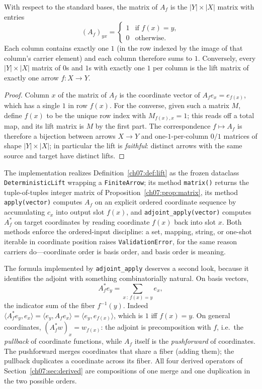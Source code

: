 \begin{proposition}\label{ch07:prop:matrix}
With respect to the standard bases, the matrix of $A_f$ is the
$|Y|\times|X|$ matrix with entries
\[
(A_f)_{y x}=
\begin{cases}
1 & \text{if } f(x)=y,\\
0 & \text{otherwise.}
\end{cases}
\]
Each column contains exactly one $1$ (in the row indexed by the image of that
column's carrier element) and each column therefore sums to $1$. Conversely,
every $|Y|\times|X|$ matrix of $0$s and $1$s with exactly one $1$ per column
is the lift matrix of exactly one arrow $f:X\to Y$.
\end{proposition}

\begin{proof}
Column $x$ of the matrix of $A_f$ is the coordinate vector of $A_f e_x =
e_{f(x)}$, which has a single $1$ in row $f(x)$. For the converse, given such
a matrix $M$, define $f(x)$ to be the unique row index with $M_{f(x),x}=1$;
this reads off a total map, and its lift matrix is $M$ by the first part. The
correspondence $f\mapsto A_f$ is therefore a bijection between arrows
$X\to Y$ and one-$1$-per-column $0/1$ matrices of shape $|Y|\times|X|$; in
particular the lift is \emph{faithful}: distinct arrows with the same source
and target have distinct lifts.
\end{proof}

The implementation realizes Definition~\ref{ch07:def:lift} as the frozen
dataclass \texttt{DeterministicLift} wrapping a \texttt{FiniteArrow}; its
method \texttt{matrix()} returns the tuple-of-tuples integer matrix of
Proposition~\ref{ch07:prop:matrix}, its method \texttt{apply(vector)}
computes $A_f$ on an explicit ordered coordinate sequence by accumulating
$c_x$ into output slot $f(x)$, and \texttt{adjoint\_apply(vector)} computes
$A_f^*$ on target coordinates by reading coordinate $f(x)$ back into slot
$x$. Both methods enforce the ordered-input discipline: a set, mapping,
string, or one-shot iterable in coordinate position raises
\texttt{ValidationError}, for the same reason carriers do---coordinate order
is basis order, and basis order is meaning.

\begin{remark}\label{ch07:rem:adjointpullback}
The formula implemented by \texttt{adjoint\_apply} deserves a second look,
because it identifies the adjoint with something combinatorially natural.
On basis vectors,
\[
A_f^* e_y=\sum_{x\,:\,f(x)=y} e_x ,
\]
the indicator sum of the fiber $f^{-1}(y)$. Indeed
$\langle A_f^* e_y, e_x\rangle = \langle e_y, A_f e_x\rangle
=\langle e_y, e_{f(x)}\rangle$, which is $1$ iff $f(x)=y$. On general
coordinates, $(A_f^* w)_x = w_{f(x)}$: the adjoint is precomposition with
$f$, i.e.\ the \emph{pullback} of coordinate functions, while $A_f$ itself is
the \emph{pushforward} of coordinates. The pushforward merges coordinates
that share a fiber (adding them); the pullback duplicates a coordinate across
its fiber. All four derived operators of Section~\ref{ch07:sec:derived} are
compositions of one merge and one duplication in the two possible orders.
\end{remark}

